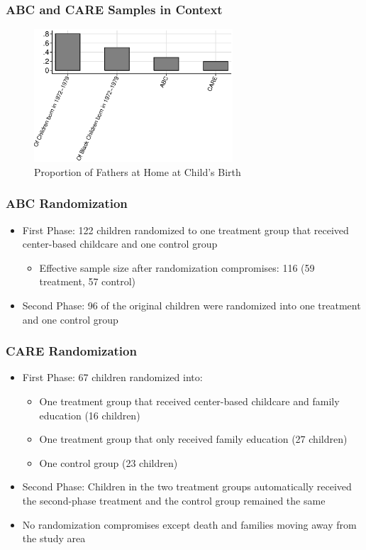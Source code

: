 \documentclass[static]{JJH-Beamer}
\begin{document}

\begin{frame}
\frametitle{ABC and CARE Samples in Context}
\begin{figure}
\caption{Proportion of Fathers at Home at Child's Birth}
	\includegraphics[width=20em]{output/abccarepsid_f_home0pool.eps}
\end{figure}
\end{frame}


\begin{frame}
\frametitle{ABC Randomization}
	\begin{itemize}
		\item First Phase: 122 children randomized to one treatment group that received center-based childcare and one control group
		\begin{itemize}
			\item Effective sample size after randomization compromises: 116 (59 treatment, 57 control)
		\end{itemize}
		\item Second Phase: 96 of the original children were randomized into one treatment and one control group
	\end{itemize}
\end{frame}


\begin{frame}
\frametitle{CARE Randomization}
	\begin{itemize}
		\item First Phase: 67 children randomized into:
		\begin{itemize}
			\item One treatment group that received center-based childcare and family education (16 children)
			\item One treatment group that only received family education (27 children)
			\item One control group (23 children)
		\end{itemize}
		\item Second Phase: Children in the two treatment groups automatically received the second-phase treatment and the control group remained the same
		\item No randomization compromises except death and families moving away from the study area
	\end{itemize}
\end{frame}
\end{document}
